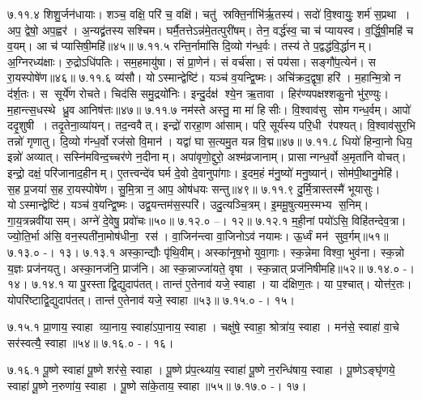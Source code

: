 ७.११.४
शिशु॒र्जन॑धायाः। शञ्च॒ वक्षि॒ परि॑ च॒ वक्षि॑। चतु॑ स्रक्ति॒र्नाभि॑र्\mbox{}ऋ॒तस्य॑। सदो॑ वि॒श्वायुः॒ शर्म॑ स॒प्रथा। अप॒ द्वेषो॒ अप॒ह्वर॑। अ॒न्यद्व्र॑तस्य सश्चिम। घर्मै॒तत्तेऽन्न॑मे॒तत्पुरी॑षम्। तेन॒ वर्द्ध॑स्व॒ चा च॑ प्यायस्व। व॒र्द्धि॒षी॒महि॑ च व॒यम्। आ च॑ प्यासिषी॒महि॑॥४५॥
७.११.५
रन्ति॒र्नामा॑सि दि॒व्यो ग॑न्ध॒र्वः। तस्य॑ ते प॒द्वद्ध॑वि॒र्द्धानम्। अ॒ग्निरध्य॑क्षाः। रु॒द्रोऽधि॑पतिः। सम॒हमायु॑षा। सं प्रा॒णेन॑। सं वर्च॑सा। सं पय॑सा। सङ्गौ॑प॒त्येन॑। स रा॒यस्पोषे॑ण॥४६॥
७.११.६
व्य॑सौ। योऽस्मान्द्वेष्टि॑। यञ्च॑ व॒यन्द्वि॒ष्मः। अचि॑क्रद॒द्वृषा॒ हरि॑। म॒हान्मि॒त्रो न द॑र्\mbox{}श॒तः। स सूर्ये॑ण रोचते। चिद॑सि समु॒द्रयो॑निः। इन्दु॒र्दक्ष॑ श्ये॒न ऋ॒तावा। हिर॑ण्यपक्षश्शकु॒नो भु॑र॒ण्युः। म॒हान्त्स॒धस्थे ध्रु॒व आनिष॑त्तः॥४७॥
७.११.७
नम॑स्ते अस्तु॒ मा मा॑ हिसीः। वि॒श्वाव॑सु सोम गन्ध॒र्वम्। आपो॑ ददृ॒शुषी। तदृ॒तेना॒व्या॑यन्। तद॒न्ववैत्। इन्द्रो॑ रारहा॒ण आ॑साम्। परि॒ सूर्य॑स्य परि॒धी र॑पश्यत्। वि॒श्वाव॑सुर॒भि तन्नो॑ गृणातु। दि॒व्यो ग॑न्ध॒र्वो रज॑सो वि॒मान॑। यद्वा॑ घा स॒त्यमु॒त यन्न वि॒द्म॥४७॥
७.११.८
धियो॑ हिन्वा॒नो धिय॒ इन्नो॑ अव्यात्। सस्नि॑मविन्द॒च्चर॑णे न॒दीनाम्। अपा॑वृणो॒द्दुरो॒ अश्म॑व्रजानाम्। प्रासान्गन्ध॒र्वो अ॒मृता॑नि वोचत्। इन्द्रो॒ दक्षं॒ परि॑जानाद॒हीनम्। ए॒तत्त्वन्दे॑व घर्म दे॒वो दे॒वानुपा॑गाः। इ॒दम॒हं म॑नु॒ष्यो॑ मनु॒ष्यान्॑। सोम॑पी॒थानु॒मेहि॑। स॒ह प्र॒जया॑ स॒ह रा॒यस्पोषे॑ण। सु॒मि॒त्रा न॒ आप॒ ओष॑धयः सन्तु॥४९॥
७.११.९
दु॒र्मि॒त्रास्तस्मै॑ भूयासुः। योऽस्मान्द्वेष्टि॑। यञ्च॑ व॒यन्द्वि॒ष्मः। उद्व॒यन्तम॑स॒स्परि॑। उदु॒त्यञ्चि॒त्रम्। इ॒ममू॒षुत्यम॒स्मभ्य स॒निम्। गा॒य॒त्रन्नवी॑यासम्। अग्ने॑ दे॒वेषु॒ प्रवो॑चः॥५०॥
७.१२.०
--। १२॥
\anuvakamend
७.१२.१
म॒ही॒नां पयो॑ऽसि॒ विहि॑तन्देव॒त्रा। ज्यो॒ति॒र्भा अ॑सि॒ वन॒स्पती॑ना॒मोष॑धीना॒ रस॑। वा॒जिन॑न्त्वा वा॒जिनोऽव॑ नयामः। ऊ॒र्ध्वं मन॑ सुव॒र्गम्॥५१॥
७.१३.०
-। १३।
\anuvakamend
७.१३.१
अस्का॒न्द्यौः पृ॑थि॒वीम्। अस्का॑नृष॒भो युवा॒गाः। स्क॒न्नेमा विश्वा॒ भुव॑ना। स्क॒न्नो य॒ज्ञः प्रज॑नयतु। अस्का॒नज॑नि॒ प्राज॑नि। आ स्क॒न्नाज्जा॑यते॒ वृषा। स्क॒न्नात् प्रज॑निषीमहि॥५२॥
७.१४.०
-। १४।
\anuvakamend
७.१४.१
या पु॒रस्ताद्वि॒द्युदाप॑तत्। तान्त॑ ए॒तेनाव॑ यजे॒ स्वाहा। या द॑क्षिण॒तः। या प॒श्चात्। योत्त॑र॒तः। योपरि॑ष्टाद्वि॒द्युदाप॑तत्। तान्त॑ ए॒तेनाव॑ यजे॒ स्वाहा॥५३॥
७.१५.०
-। १५।
\anuvakamend

७.१५.१
प्रा॒णाय॒ स्वाहा व्या॒नाय॒ स्वाहा॑ऽपा॒नाय॒ स्वाहा। चक्षु॑षे॒ स्वाहा॒ श्रोत्रा॑य॒ स्वाहा। मन॑से॒ स्वाहा॑ वा॒चे सर॑स्वत्यै॒ स्वाहा॥५४॥
७.१६.०
-। १६।
\anuvakamend


७.१६.१
पू॒ष्णे स्वाहा॑ पू॒ष्णे शर॑से॒ स्वाहा। पू॒ष्णे प्र॑प॒त्थ्या॑य॒ स्वाहा॑ पू॒ष्णे न॒रन्धि॑षाय॒ स्वाहा। पू॒ष्णेऽङ्घृ॑णये॒ स्वाहा॑ पू॒ष्णे न॒रुणा॑य॒ स्वाहा। पू॒ष्णे सा॑के॒ताय॒ स्वाहा॥५५॥
७.१७.०
-। १७।
\anuvakamend

